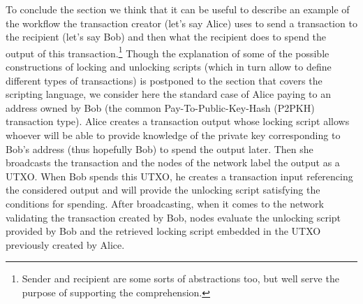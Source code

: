 To conclude the section we think that it can be useful to describe an example of the workflow the transaction creator (let's say Alice) uses to send a transaction to the recipient (let's say Bob) and then what the recipient does to spend the output of this transaction.\footnote{Sender and recipient are some sorts of abstractions too, but well serve the purpose of supporting the comprehension.} Though the explanation of some of the possible constructions of locking and unlocking scripts (which in turn allow to define different types of transactions) is postponed to the section that covers the scripting language, we consider here the standard case of Alice paying to an address owned by Bob (the common Pay-To-Public-Key-Hash (P2PKH) transaction type). Alice creates a transaction output whose locking script allows whoever will be able to provide knowledge of the private key corresponding to Bob's address (thus hopefully Bob) to spend the output later. Then she broadcasts the transaction and the nodes of the network label the output as a UTXO. When Bob spends this UTXO, he creates a transaction input referencing the considered output and will provide the unlocking script satisfying the conditions for spending. After broadcasting, when it comes to the network validating the transaction created by Bob, nodes evaluate the unlocking script provided by Bob and the retrieved locking script embedded in the UTXO previously created by Alice. 

